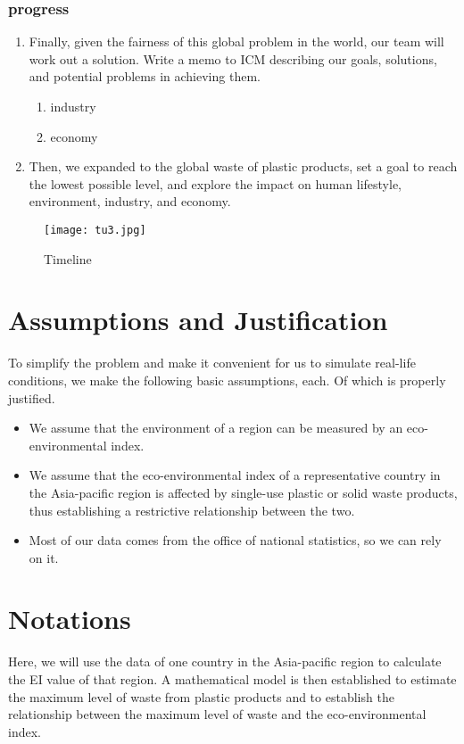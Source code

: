\documentclass[12pt]{article}
\begin{document}
\subsubsection{progress}
\begin{enumerate}
\item Finally, given the fairness of this global problem in the world, our team will work out a solution. Write a memo to ICM describing our goals, solutions, and potential problems in achieving them.
     \begin{enumerate}
     \item industry
     \item economy
     \end{enumerate}
\item Then, we expanded to the global waste of plastic products, set a goal to reach the lowest possible level, and explore the impact on human lifestyle, environment, industry, and economy.

\end{enumerate}
\begin{figure}[htb]  %
\centering %
\texttt{[image: tu3.jpg]}
\caption{Timeline}\label{tu2}
\end{figure}
\section{Assumptions and Justification}
To simplify the problem and make it convenient for us to simulate real-life conditions, we make the following basic assumptions, each. Of which is properly justified.
\begin{itemize}
\item We assume that the environment of a region can be measured by an eco-environmental index.
\item We assume that the eco-environmental index of a representative country in the Asia-pacific region is affected by single-use plastic or solid waste products, thus establishing a restrictive relationship between the two.
\item Most of our data comes from the office of national statistics, so we can rely on it.
\end{itemize}
\section{Notations}

Here, we will use the data of one country in the Asia-pacific region to calculate the EI value of that region. A mathematical model is then established to estimate the maximum level of waste from plastic products and to establish the relationship between the maximum level of waste and the eco-environmental index.
\end{document}

